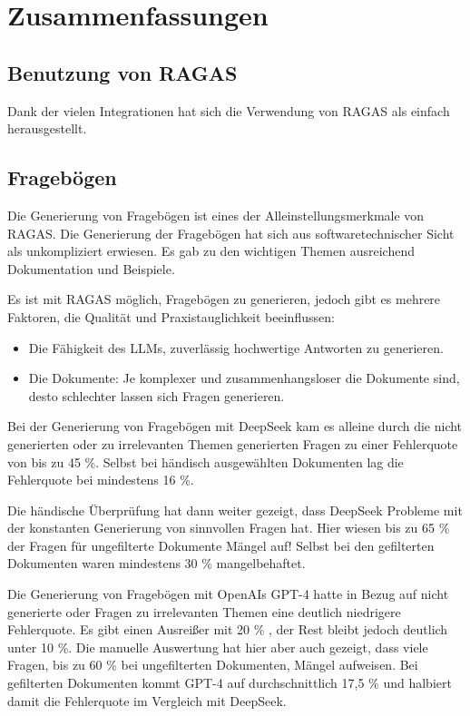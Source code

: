 \chapter{Zusammenfassungen}

\section{Benutzung von RAGAS}
Dank der vielen Integrationen hat sich die Verwendung von RAGAS als einfach herausgestellt.

\section{Fragebögen}
Die Generierung von Fragebögen ist eines der Alleinstellungsmerkmale von RAGAS. Die Generierung der Fragebögen hat sich aus softwaretechnischer Sicht als unkompliziert erwiesen.
Es gab zu den wichtigen Themen ausreichend Dokumentation und Beispiele.

Es ist mit RAGAS möglich, Fragebögen zu generieren, jedoch gibt es mehrere Faktoren, die Qualität und Praxistauglichkeit beeinflussen:
\begin{itemize}
    \item Die Fähigkeit des LLMs, zuverlässig hochwertige Antworten zu generieren.
    \item Die Dokumente: Je komplexer und zusammenhangsloser die Dokumente sind, desto schlechter lassen sich Fragen generieren.
\end{itemize}

Bei der Generierung von Fragebögen mit DeepSeek kam es alleine durch die nicht generierten oder zu irrelevanten Themen generierten Fragen zu einer Fehlerquote von bis zu 45 \%.
Selbst bei händisch ausgewählten Dokumenten lag die Fehlerquote bei mindestens 16 \%.

Die händische Überprüfung hat dann weiter gezeigt, dass DeepSeek Probleme mit der konstanten Generierung von sinnvollen Fragen hat.
Hier wiesen bis zu 65 \% der Fragen für ungefilterte Dokumente Mängel auf! Selbst bei den gefilterten Dokumenten waren mindestens 30 \% mangelbehaftet.

Die Generierung von Fragebögen mit OpenAIs GPT-4 hatte in Bezug auf nicht generierte oder Fragen zu irrelevanten Themen eine deutlich niedrigere Fehlerquote.
Es gibt einen Ausreißer mit 20 \% , der Rest bleibt jedoch deutlich unter 10 \%.
Die manuelle Auswertung hat hier aber auch gezeigt, dass viele Fragen, bis zu 60 \% bei ungefilterten Dokumenten, Mängel aufweisen.
Bei gefilterten Dokumenten kommt GPT-4 auf durchschnittlich 17,5 \% und halbiert damit die Fehlerquote im Vergleich mit DeepSeek.

